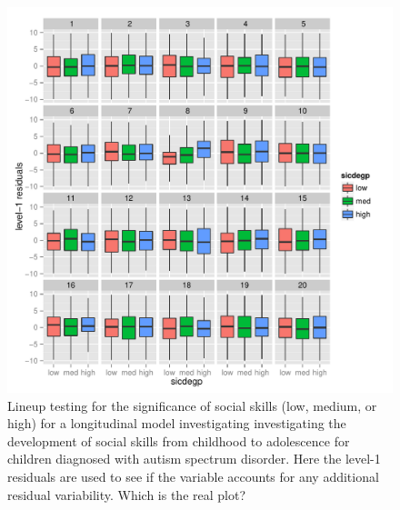 \documentclass{article} %
\begin{document}
\begin{figure}
	\centering
	\includegraphics[width=\textwidth]{autism_sicdegp_level1_lineup8.pdf}
	\caption{\label{fig:boxplot-ordered} Lineup testing for the significance of social skills (low, medium, or high) for a longitudinal model investigating investigating the development of social skills from childhood to adolescence for children diagnosed with autism spectrum disorder. Here the level-1 residuals are used to see if the variable accounts for any additional residual variability. Which is the real plot?}
\end{figure}
\end{document}
